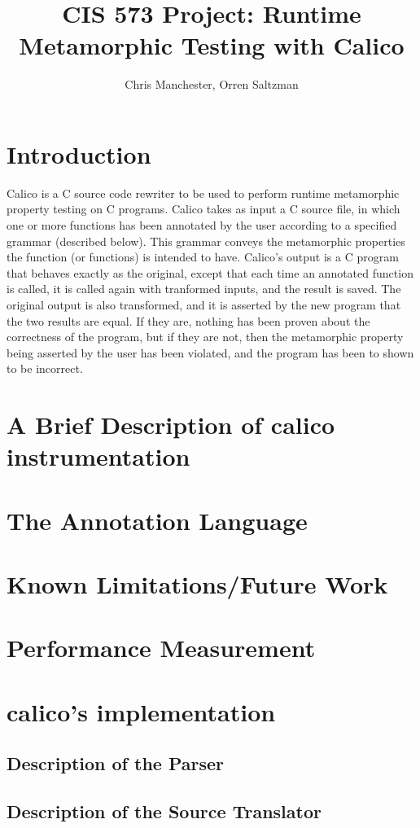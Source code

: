 \documentclass[notitlepage]{article}
\author{Chris Manchester, Orren Saltzman}
\title{CIS 573 Project: Runtime Metamorphic Testing with Calico}
\begin{document}
\maketitle

\section{Introduction}

Calico is a C source code rewriter to be used to perform runtime metamorphic property testing on C programs. Calico takes as input a C source file, in which one or more functions has been annotated by the user according to a specified grammar (described below). This grammar conveys the metamorphic properties the function (or functions) is intended to have. Calico's output is a C program that behaves exactly as the original, except that each time an annotated function is called, it is called again with tranformed inputs, and the result is saved. The original output is also transformed, and it is asserted by the new program that the two results are equal. If they are, nothing has been proven about the correctness of the program, but if they are not, then the metamorphic property being asserted by the user has been violated, and the program has been to shown to be incorrect.

\section{A Brief Description of calico instrumentation}

\section{The Annotation Language}

\section{Known Limitations/Future Work}

\section{Performance Measurement}

\section{calico's implementation}

\subsection{Description of the Parser}

\subsection{Description of the Source Translator}
\end{document}
